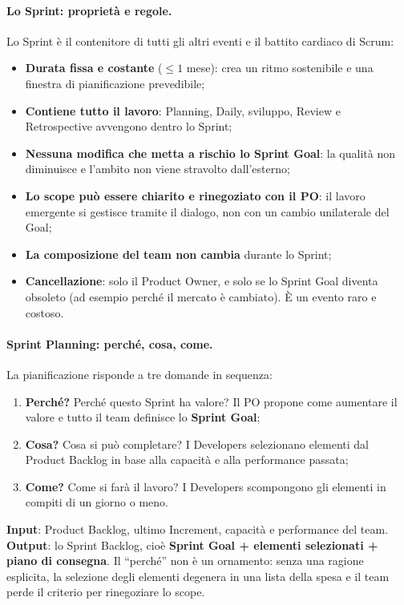 \documentclass[12pt]{extarticle}
\begin{document}
\paragraph{Lo Sprint: proprietà e regole.}
Lo Sprint è il contenitore di tutti gli altri eventi e il battito cardiaco di Scrum:
\begin{itemize}
    \item \textbf{Durata fissa e costante} ($\leq 1$ mese): crea un ritmo sostenibile e una finestra di pianificazione prevedibile;
    \item \textbf{Contiene tutto il lavoro}: Planning, Daily, sviluppo, Review e Retrospective avvengono dentro lo Sprint;
    \item \textbf{Nessuna modifica che metta a rischio lo Sprint Goal}: la qualità non diminuisce e l'ambito non viene stravolto dall'esterno;
    \item \textbf{Lo scope può essere chiarito e rinegoziato con il PO}: il lavoro emergente si gestisce tramite il dialogo, non con un cambio unilaterale del Goal;
    \item \textbf{La composizione del team non cambia} durante lo Sprint;
    \item \textbf{Cancellazione}: solo il Product Owner, e solo se lo Sprint Goal diventa obsoleto (ad esempio perché il mercato è cambiato). È un evento raro e costoso.
\end{itemize}

\paragraph{Sprint Planning: perché, cosa, come.}
La pianificazione risponde a tre domande in sequenza:
\begin{enumerate}
    \item \textbf{Perché?} Perché questo Sprint ha valore? Il PO propone come aumentare il valore e tutto il team definisce lo \textbf{Sprint Goal};
    \item \textbf{Cosa?} Cosa si può completare? I Developers selezionano elementi dal Product Backlog in base alla capacità e alla performance passata;
    \item \textbf{Come?} Come si farà il lavoro? I Developers scompongono gli elementi in compiti di un giorno o meno.
\end{enumerate}
\noindent \textbf{Input}: Product Backlog, ultimo Increment, capacità e performance del team. \textbf{Output}: lo Sprint Backlog, cioè \textbf{Sprint Goal + elementi selezionati + piano di consegna}. Il ``perché'' non è un ornamento: senza una ragione esplicita, la selezione degli elementi degenera in una lista della spesa e il team perde il criterio per rinegoziare lo scope.
\end{document}
